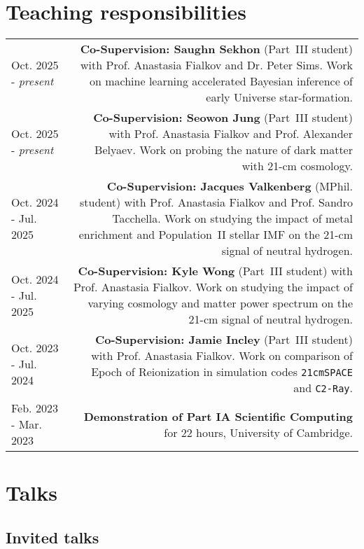 \documentclass{article}
\begin{document}
\section*{Teaching responsibilities}

\begin{longtable}{L!{\vrule}R}

	Oct. 2025 - \textit{present} & \textbf{Co-Supervision: Saughn Sekhon} (Part~III student) with Prof. Anastasia Fialkov and Dr. Peter Sims. Work on machine learning accelerated Bayesian inference of early Universe star-formation. \\

	Oct. 2025 - \textit{present} & \textbf{Co-Supervision: Seowon Jung} (Part~III student) with Prof. Anastasia Fialkov and Prof. Alexander Belyaev. Work on probing the nature of dark matter with 21-cm cosmology. \\

	Oct. 2024 - Jul. 2025 & \textbf{Co-Supervision: Jacques Valkenberg} (MPhil. student) with Prof. Anastasia Fialkov and Prof. Sandro Tacchella. Work on studying the impact of metal enrichment and Population~II stellar IMF on the 21-cm signal of neutral hydrogen. \\

	Oct. 2024 - Jul. 2025 & \textbf{Co-Supervision: Kyle Wong} (Part~III student) with Prof. Anastasia Fialkov. Work on studying the impact of varying cosmology and matter power spectrum on the 21-cm signal of neutral hydrogen. \\

	Oct. 2023 - Jul. 2024 & \textbf{Co-Supervision: Jamie Incley} (Part~III student) with Prof. Anastasia Fialkov. Work on comparison of Epoch of Reionization in simulation codes \texttt{21cmSPACE} and \texttt{C2-Ray}. \\

  Feb. 2023 - Mar. 2023 & \textbf{Demonstration of Part IA Scientific Computing} for 22 hours, University of Cambridge.\\

\end{longtable}

\section*{Talks}

\subsection*{Invited talks}
\end{document}
